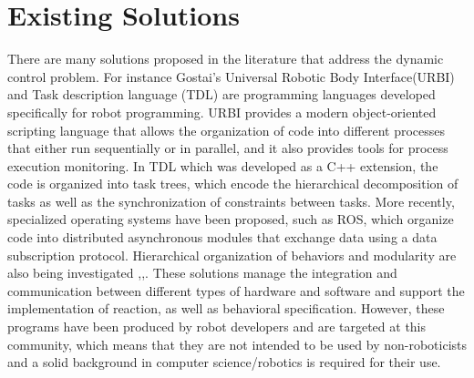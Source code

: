 \section{Existing Solutions}
There are many solutions  proposed in the literature that address the dynamic control problem. For instance Gostai's Universal Robotic Body Interface(URBI)\cite{Baillie4814281} and Task description language (TDL)\cite{Simmons724883} are programming languages developed specifically for robot programming. URBI provides a modern object-oriented scripting language that allows the organization of code into different processes that either run sequentially or in parallel, and it also provides tools for process execution monitoring. In TDL which was developed as a C++ extension, the code is organized into task trees, which encode the hierarchical decomposition of tasks as well as the synchronization of constraints between tasks.
More recently, specialized operating systems have been proposed, such as ROS\cite{quigley2009ros}, which organize code into distributed asynchronous modules that exchange data using a data subscription protocol. Hierarchical organization of behaviors and modularity are also being investigated \cite{Jaegeretal},\cite{Baldassarre:2013:CRM:2560111},\cite{hurdus4648045}. These solutions manage the integration and communication between different types of hardware and software and support the implementation of reaction, as well as behavioral specification. However, these programs have been produced by robot developers and are targeted at this community, which means that they are not intended to be used by non-roboticists and a solid background in computer science/robotics is required for their use.
